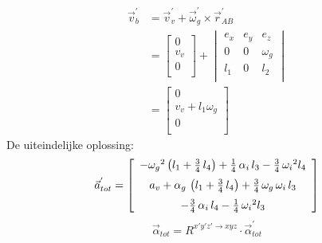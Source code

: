 \begin{equation}
\begin{split}
\vec{v}_{b}^{'}&=\vec{v}_{v}^{'}+\vec{\omega}_{g}^{'}\times\vec{r}_{AB}^{'}\\
&=\begin{bmatrix}
0\\
v_{v}\\
0\\
\end{bmatrix}
+\begin{vmatrix}
e_{x}&e_{y}&e_{z}\\
0&0&\omega_{g}\\
l_{1}&0&l_{2}\\
\end{vmatrix}\\
&=\begin{bmatrix}
0\\
v_{v}+l_{1}\omega_{g}\\
0\\
\end{bmatrix}
\label{eq:kin4.11}
\end{split}
\end{equation}
De uiteindelijke oplossing:
\begin{equation}
\vec{a}_{tot}^{'}=\left[ \begin {array}{c} -{\omega_{g}}^{2} \left( l_{1}+\frac{3}{4}\,l_{4} \right) +\frac{1}{4} \,\alpha_{i}\,l_{3}-\frac{3}{4}\,{\omega_{i}}^{2}l_{4}\\ \noalign{\medskip}a_{v}+\alpha_{g}\, \left( l_{1}+\frac{3}{4}\,l_{4} \right) +\frac{3}{4}\,\omega_{g}\,\omega_{i}\,l_{3}\\ \noalign{\medskip}-\frac{3}{4}\,\alpha_{i}\,l_{4}-\frac{1}{4}\,{\omega_{i}}^{2}l_{3}\end {array} \right]
\label{eq:kin4.12}
\end{equation}
\begin{equation}
\vec{\alpha}_{tot}=R^{x'y'z' \rightarrow xyz}\cdot\vec{\alpha}_{tot}^{'}
\end{equation}
\newpage